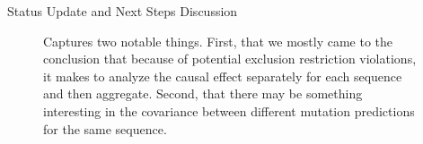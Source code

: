 \begin{Minutes}{Status Update and Next Steps Discussion}
\begin{figure}[h]
    \caption{Captures two notable things. First, that we mostly came to the conclusion that because of potential exclusion restriction violations, it makes to analyze the causal effect separately for each sequence and then aggregate. Second, that there may be something interesting in the covariance between different mutation predictions for the same sequence.}
    \label{fig:2}
\end{figure}

\end{Minutes}
